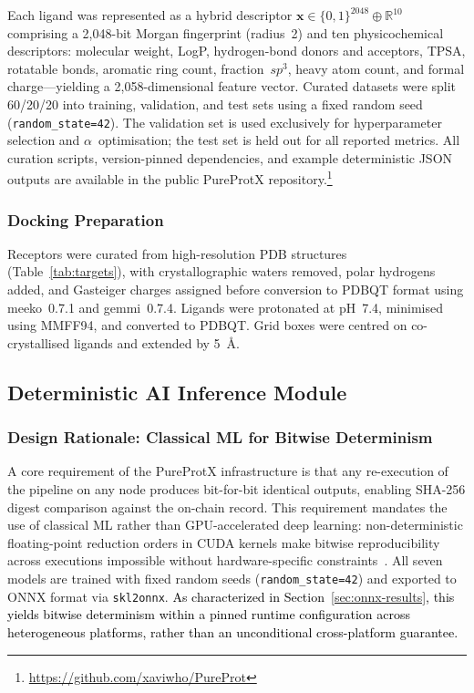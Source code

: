 \documentclass[conference]{IEEEtran}
\begin{document}
Each ligand was represented as a hybrid descriptor
$\mathbf{x} \in \{0,1\}^{2048} \oplus \mathbb{R}^{10}$
comprising a 2{,}048-bit Morgan fingerprint (radius~2) and
ten physicochemical descriptors: molecular weight, LogP,
hydrogen-bond donors and acceptors, TPSA, rotatable bonds,
aromatic ring count, fraction~$sp^3$, heavy atom count, and
formal charge---yielding a 2{,}058-dimensional feature vector.
Curated datasets were split 60/20/20 into training, validation,
and test sets using a fixed random seed (\texttt{random\_state=42}).
The validation set is used exclusively for hyperparameter
selection and $\alpha$~optimisation; the test set is held out
for all reported metrics.
All curation scripts, version-pinned dependencies, and example
deterministic JSON outputs are available in the public
PureProtX repository.\footnote{\url{https://github.com/xaviwho/PureProt}}

\subsubsection{Docking Preparation}
Receptors were curated from high-resolution PDB structures
(Table~\ref{tab:targets}), with crystallographic waters removed,
polar hydrogens added, and Gasteiger charges assigned before
conversion to PDBQT format using meeko~0.7.1 and gemmi~0.7.4.
Ligands were protonated at pH~7.4, minimised using MMFF94, and
converted to PDBQT.
Grid boxes were centred on co-crystallised ligands and extended
by 5~\AA.

\subsection{\textbf{Deterministic AI Inference Module}}
\label{sec:ai}

\subsubsection{Design Rationale: Classical ML for Bitwise Determinism}

A core requirement of the PureProtX infrastructure is that
any re-execution of the pipeline on any node produces
bit-for-bit identical outputs, enabling SHA-256 digest
comparison against the on-chain record.
This requirement mandates the use of classical ML rather
than GPU-accelerated deep learning: non-deterministic
floating-point reduction orders in CUDA kernels make
bitwise reproducibility across executions impossible
without hardware-specific constraints~\cite{heumos2023mlf}.
All seven models are trained with fixed random seeds
(\texttt{random\_state=42}) and exported to ONNX format
via \texttt{skl2onnx}. \textcolor{black}{As characterized in
Section~\ref{sec:onnx-results}, this yields bitwise
determinism within a pinned runtime configuration across
heterogeneous platforms, rather than an unconditional
cross-platform guarantee.}
\end{document}
